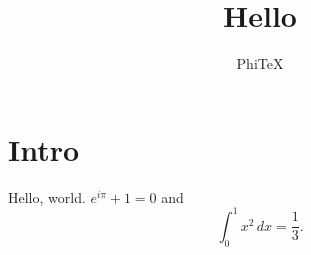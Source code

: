 \documentclass{article}
\title{Hello}
\author{PhiTeX}
\begin{document}
\maketitle
\section{Intro}
Hello, world. $e^{i\pi}+1=0$ and
\begin{equation} \int_0^1 x^2\,dx = \frac13. \end{equation}
\end{document}
